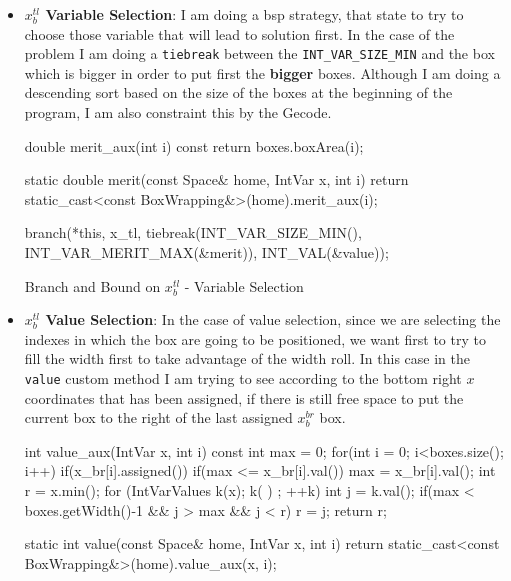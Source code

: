 \documentclass[12pt, a4paper]{article}
\begin{document}
\begin{itemize}
  \item \textbf{$x_b^{tl}$ Variable Selection}: I am doing a \acrfull{bsp} strategy, that state to try to choose those variable that will lead to solution first. In the case of the problem I am doing a \texttt{tiebreak} between the \texttt{INT_VAR_SIZE_MIN} and the box which is bigger in order to put first the \textbf{bigger} boxes. Although I am doing a descending sort based on the size of the boxes at the beginning of the program, I am also constraint this by the Gecode.


\begin{listing}[H]
\begin{cppcode*}{}
  double merit_aux(int i) const{
    return boxes.boxArea(i);
  }

  static double merit(const Space& home, IntVar x, int i){
    return static_cast<const BoxWrapping&>(home).merit_aux(i);
  }

  branch(*this, x_tl,
                tiebreak(INT_VAR_SIZE_MIN(),
                         INT_VAR_MERIT_MAX(&merit)),
                INT_VAL(&value));
\end{cppcode*}
\caption{Branch and Bound on $x_b^{tl}$ - Variable Selection}
\label{lst:branch_var_x_tl}
\end{listing}

\item \textbf{$x_b^{tl}$ Value Selection}: In the case of value selection, since we are selecting the indexes in which the box are going to be positioned, we want first to try to fill the width first to take advantage of the width roll. In this case in the \texttt{value} custom method I am trying to see according to the bottom right $x$ coordinates that has been assigned, if there is still free space to put the current box to the right of the last assigned $x_b^{br}$ box.


\begin{listing}[H]
\begin{cppcode*}{}
  int value_aux(IntVar x, int i) const{
    int max = 0;
    for(int i = 0; i<boxes.size(); i++){
      if(x_br[i].assigned()){
        if(max <= x_br[i].val()){
          max = x_br[i].val();
        }
      }
    }
    int r = x.min();
    for (IntVarValues k(x); k( ) ; ++k){
      int j  = k.val();
      if(max < boxes.getWidth()-1 && j > max && j < r){
        r = j;
      }
    }
    return r;
  }

  static int value(const Space& home, IntVar x, int i) {
    return static_cast<const BoxWrapping&>(home).value_aux(x, i);
  }


\end{cppcode*}
\end{listing}
\end{itemize}
\end{document}
